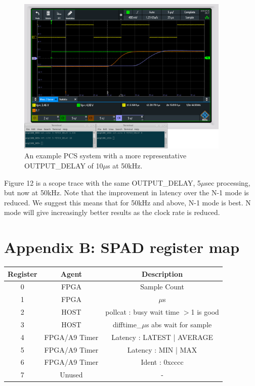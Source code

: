 \documentclass{article}
\begin{document}
\begin{figure}
	\centering
	\includegraphics[width=4.0in]{images/n-mode-pcs-scope-trace-50kHz.png}
	\caption{An example PCS system with a more representative OUTPUT\_DELAY of 10$\mu$s at 50kHz.}
	\label{50repscope}
\end{figure}

Figure 12 is a scope trace with the same OUTPUT\_DELAY, 5$\mu$sec processing, but now at 50kHz.
Note that the improvement in latency over the N-1 mode is reduced.
We suggest this means that for 50kHz and above, N-1 mode is best.
N mode will give increasingly better results as the clock rate is reduced.

\section{Appendix B: SPAD register map}

\begin{center}
	\begin{tabular}{||c c c||} 
		\hline
		Register & Agent & Description \\ \hline\hline\hline
		0 & FPGA & Sample Count \\
		\hline
		1 & FPGA & $\mu$s \\
		\hline
		2 & HOST & pollcat : busy wait time $>$1 is good \\
		\hline
		3 & HOST & difftime\_$\mu$s abs wait for sample \\ [1ex] 
		\hline
		4 & FPGA/A9 Timer & Latency : LATEST | AVERAGE \\
		\hline
		5 & FPGA/A9 Timer & Latency : MIN | MAX \\
		\hline
		6 & FPGA/A9 Timer & Ident : 0xcccc \\
		\hline
		7 & Unused & - \\
		\hline
	\end{tabular}
\end{center}
\end{document}
